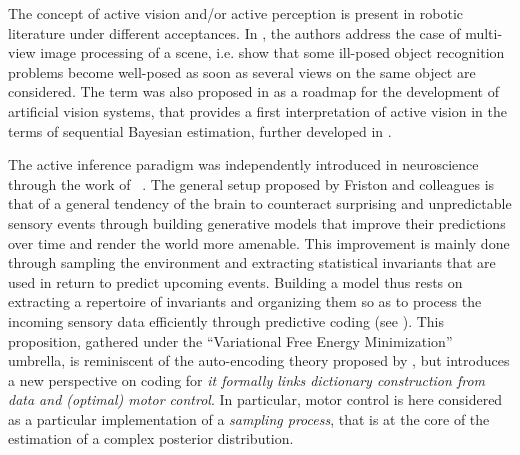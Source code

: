 \documentclass{article} %
\begin{document}
	
	
	
	The concept of active vision and/or active perception is present in robotic literature under different acceptances. In \cite{aloimonos1988active}, the authors address the case of multi-view image processing of a scene, i.e. show that some ill-posed object recognition problems become well-posed as soon as several views on the  same object are considered. The term was also proposed in \cite{bajcsy1988active} as a roadmap for the development of artificial vision systems, that provides a first interpretation of active vision in the terms of sequential Bayesian estimation, further developed in \cite{najemnik2005optimal,butko2010infomax,ahmad2013active,potthast2016active}.
	
The active inference paradigm was independently introduced in neuroscience through the work of ~\cite{friston2010free,friston2012perceptions}. %
The general setup proposed by Friston and colleagues is that of a general tendency of the brain to counteract surprising and unpredictable sensory events through building generative models that improve their predictions over time and render the world more amenable. This improvement is mainly done through sampling the environment and extracting statistical invariants that are used in return to predict upcoming events.
Building a model thus rests on extracting a repertoire of invariants and organizing them so as to process the incoming sensory data efficiently through predictive coding (see \cite{rao1999predictive}). This proposition, gathered under the ``Variational Free Energy Minimization'' umbrella, is reminiscent of the auto-encoding theory proposed by \cite{hinton1994autoencoders}, but introduces a new perspective on coding
for \emph{it formally links dictionary construction from data and (optimal) motor control}.
In particular, motor control is here considered as a particular implementation of a \emph{sampling process}, that is at the core of the estimation of a complex posterior distribution. 
\end{document}
